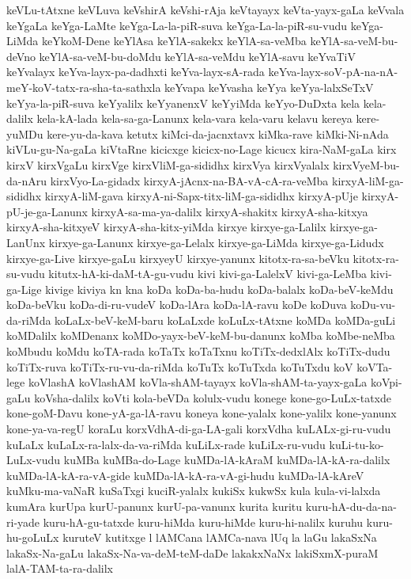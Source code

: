 {keVLu-tAtxne
keVLuva
keVshirA
keVshi-rAja
keVtayayx
keVta-yayx-gaLa
keVvala
keYgaLa
keYga-LaMte
keYga-La-la-piR-suva
keYga-La-la-piR-su-vudu
keYga-LiMda
keYkoM-Dene
keYlAsa
keYlA-sakekx
keYlA-sa-veMba
keYlA-sa-veM-bu-deVno
keYlA-sa-veM-bu-doMdu
keYlA-sa-veMdu
keYlA-savu
keYvaTiV
keYvalayx
keYva-layx-pa-dadhxti
keYva-layx-sA-rada
keYva-layx-soV-pA-na-nA-meY-koV-tatx-ra-sha-ta-sathxla
keYvapa
keYvasha
keYya
keYya-lalxSeTxV
keYya-la-piR-suva
keYyalilx
keYyanenxV
keYyiMda
keYyo-DuDxta
kela
kela-dalilx
kela-kA-lada
kela-sa-ga-Lanunx
kela-vara
kela-varu
kelavu
kereya
kere-yuMDu
kere-yu-da-kava
ketutx
kiMci-da-jacnxtavx
kiMka-rave
kiMki-Ni-nAda
kiVLu-gu-Na-gaLa
kiVtaRne
kicicxge
kicicx-no-Lage
kicucx
kira-NaM-gaLa
kirx
kirxV
kirxVgaLu
kirxVge
kirxVliM-ga-sididhx
kirxVya
kirxVyalalx
kirxVyeM-bu-da-nAru
kirxVyo-La-gidadx
kirxyA-jAcnx-na-BA-vA-cA-ra-veMba
kirxyA-liM-ga-sididhx
kirxyA-liM-gava
kirxyA-ni-Sapx-titx-liM-ga-sididhx
kirxyA-pUje
kirxyA-pU-je-ga-Lanunx
kirxyA-sa-ma-ya-dalilx
kirxyA-shakitx
kirxyA-sha-kitxya
kirxyA-sha-kitxyeV
kirxyA-sha-kitx-yiMda
kirxye
kirxye-ga-Lalilx
kirxye-ga-LanUnx
kirxye-ga-Lanunx
kirxye-ga-Lelalx
kirxye-ga-LiMda
kirxye-ga-Lidudx
kirxye-ga-Live
kirxye-gaLu
kirxyeyU
kirxye-yanunx
kitotx-ra-sa-beVku
kitotx-ra-su-vudu
kitutx-hA-ki-daM-tA-gu-vudu
kivi
kivi-ga-LalelxV
kivi-ga-LeMba
kivi-ga-Lige
kivige
kiviya
kn
kna
koDa
koDa-ba-hudu
koDa-balalx
koDa-beV-keMdu
koDa-beVku
koDa-di-ru-vudeV
koDa-lAra
koDa-lA-ravu
koDe
koDuva
koDu-vu-da-riMda
koLaLx-beV-keM-baru
koLaLxde
koLuLx-tAtxne
koMDa
koMDa-guLi
koMDalilx
koMDenanx
koMDo-yayx-beV-keM-bu-danunx
koMba
koMbe-neMba
koMbudu
koMdu
koTA-rada
koTaTx
koTaTxnu
koTiTx-dedxlAlx
koTiTx-dudu
koTiTx-ruva
koTiTx-ru-vu-da-riMda
koTuTx
koTuTxda
koTuTxdu
koV
koVTa-lege
koVlashA
koVlashAM
koVla-shAM-tayayx
koVla-shAM-ta-yayx-gaLa
koVpi-gaLu
koVsha-dalilx
koVti
kola-beVDa
kolulx-vudu
konege
kone-go-LuLx-tatxde
kone-goM-Davu
kone-yA-ga-lA-ravu
koneya
kone-yalalx
kone-yalilx
kone-yanunx
kone-ya-va-regU
koraLu
korxVdhA-di-ga-LA-gali
korxVdha
kuLALx-gi-ru-vudu
kuLaLx
kuLaLx-ra-lalx-da-va-riMda
kuLiLx-rade
kuLiLx-ru-vudu
kuLi-tu-ko-LuLx-vudu
kuMBa
kuMBa-do-Lage
kuMDa-lA-kAraM
kuMDa-lA-kA-ra-dalilx
kuMDa-lA-kA-ra-vA-gide
kuMDa-lA-kA-ra-vA-gi-hudu
kuMDa-lA-kAreV
kuMku-ma-vaNaR
kuSaTxgi
kuciR-yalalx
kukiSx
kukwSx
kula
kula-vi-lalxda
kumAra
kurUpa
kurU-panunx
kurU-pa-vanunx
kurita
kuritu
kuru-hA-du-da-na-ri-yade
kuru-hA-gu-tatxde
kuru-hiMda
kuru-hiMde
kuru-hi-nalilx
kuruhu
kuru-hu-goLuLx
kuruteV
kutitxge
l
lAMCana
lAMCa-nava
lUq
la
laGu
lakaSxNa
lakaSx-Na-gaLu
lakaSx-Na-va-deM-teM-daDe
lakakxNaNx
lakiSxmX-puraM
lalA-TAM-ta-ra-dalilx
}

